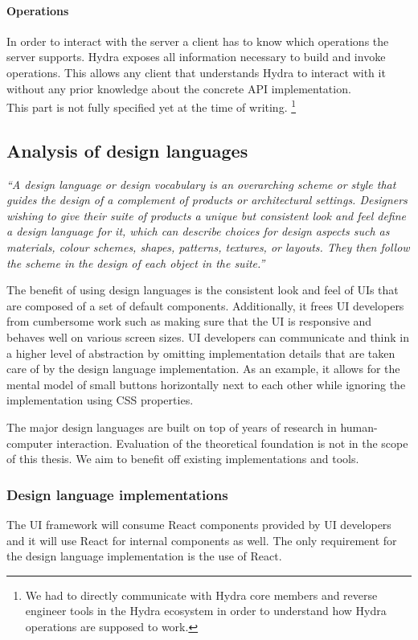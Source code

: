 \paragraph{Operations}
In order to interact with the server a client has to know which operations the server supports. Hydra exposes all information necessary to build and invoke operations. This allows any client that understands Hydra to interact with it without any prior knowledge about the concrete API implementation. \\
This part is not fully specified yet at the time of writing. \footnote{We had to directly communicate with Hydra core members and reverse engineer tools in the Hydra ecosystem in order to understand how Hydra operations are supposed to work.}

\subsection{Analysis of design languages}
\textit{``A design language or design vocabulary is an overarching scheme or style that guides the design of a complement of products or architectural settings. Designers wishing to give their suite of products a unique but consistent look and feel define a design language for it, which can describe choices for design aspects such as materials, colour schemes, shapes, patterns, textures, or layouts. They then follow the scheme in the design of each object in the suite.''} \citep{designlanguage}

The benefit of using design languages is the consistent look and feel of UIs that are composed of a set of default components. Additionally, it frees UI developers from cumbersome work such as making sure that the UI is responsive and behaves well on various screen sizes. UI developers can communicate and think in a higher level of abstraction by omitting implementation details that are taken care of by the design language implementation. As an example, it allows for the mental model of small buttons horizontally next to each other while ignoring the implementation using CSS properties.

The major design languages are built on top of years of research in human-computer interaction. Evaluation of the theoretical foundation is not in the scope of this thesis. We aim to benefit off existing implementations and tools.

\subsubsection{Design language implementations}
The UI framework will consume React components provided by UI developers and it will use React for internal components as well. The only requirement for the design language implementation is the use of React.


